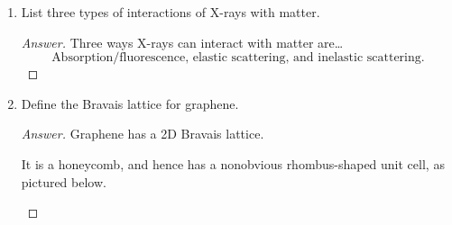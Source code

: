 \documentclass[../psets.tex]{subfiles}
\begin{document}
\begin{enumerate}
\begin{proof}[Answer]
         will work better for X-ray absorption.\par
        Absorption depends on \emph{contact}, a quantity proportional to the atomic number $Z$ of the target element. Thus, elements with higher $Z$-numbers will have greater contact and hence greater absorption. It follows since $Z(\ce{Pb})>Z(\ce{Fe})$ that  has greater X-ray absorption.
    \end{proof}
    \pagebreak
    \item List three types of interactions of X-rays with matter.
    \begin{proof}[Answer]
        Three ways X-rays can interact with matter are\dots
        \begin{equation*}
            \boxed{\text{Absorption/fluorescence, elastic scattering, and inelastic scattering.}}
        \end{equation*}
    \end{proof}
    \item Define the Bravais lattice for graphene.
    \begin{proof}[Answer]
        Graphene has a  2D Bravais lattice.\par
        It is a honeycomb, and hence has a nonobvious rhombus-shaped unit cell, as pictured below.
        \begin{center}
\end{center}
\end{proof}
\end{enumerate}
\end{document}

